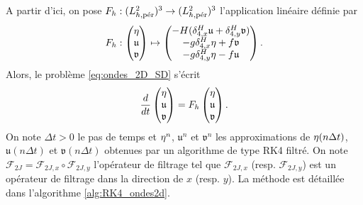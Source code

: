 A partir d'ici, on pose $F_h : (L_{h,\per}^2)^3 \rightarrow (L_{h,\per}^2)^3$ l'application linéaire définie par
\begin{equation}
F_h : \begin{pmatrix}
\etafrak \\ \mathfrak{u} \\ \mathfrak{v}
\end{pmatrix} \mapsto \begin{pmatrix}
- H (\delta_{4,x}^H \mathfrak{u} + \delta_{4,y}^H \mathfrak{v}) \\
- g \delta_{4,x}^H \etafrak + f \mathfrak{v} \\
- g \delta_{4,y}^H \etafrak - f \mathfrak{u}
\end{pmatrix}.
\end{equation}
Alors, le problème \eqref{eq:ondes_2D_SD} s'écrit
\begin{equation}
\dfrac{d}{dt} \begin{pmatrix}
\etafrak \\ \mathfrak{u} \\ \mathfrak{v}
\end{pmatrix} = F_h\begin{pmatrix}
\etafrak \\ \mathfrak{u} \\ \mathfrak{v}
\end{pmatrix}.
\end{equation}
On note $\Delta t>0$ le pas de temps et $\etafrak^n$, $\mathfrak{u}^n$ et $\mathfrak{v}^n$ les approximations de $\etafrak(n\Delta t)$, $\mathfrak{u}(n \Delta t)$ et $\mathfrak{v}(n \Delta t)$ obtenues par un algorithme de type RK4 filtré. On note $\mathcal{F}_{2J} = \mathcal{F}_{2J,x} \circ \mathcal{F}_{2J,y}$ l'opérateur de filtrage tel que $\mathcal{F}_{2J,x}$ (resp. $\mathcal{F}_{2J,y}$) est un opérateur de filtrage dans la direction de $x$ (resp. $y$). La méthode est détaillée dans l'algorithme \ref{alg:RK4_ondes2d}.

